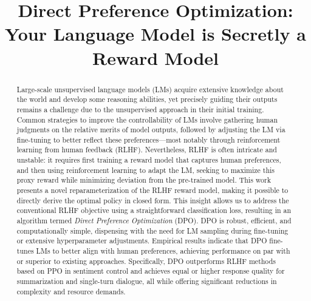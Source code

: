 \title{Direct Preference Optimization: Your Language Model is Secretly a Reward Model}

\begin{abstract}
Large-scale unsupervised language models (LMs) acquire extensive knowledge about the world and develop some reasoning abilities, yet precisely guiding their outputs remains a challenge due to the unsupervised approach in their initial training. Common strategies to improve the controllability of LMs involve gathering human judgments on the relative merits of model outputs, followed by adjusting the LM via fine-tuning to better reflect these preferences—most notably through reinforcement learning from human feedback (RLHF). Nevertheless, RLHF is often intricate and unstable: it requires first training a reward model that captures human preferences, and then using reinforcement learning to adapt the LM, seeking to maximize this proxy reward while minimizing deviation from the pre-trained model. This work presents a novel reparameterization of the RLHF reward model, making it possible to directly derive the optimal policy in closed form. This insight allows us to address the conventional RLHF objective using a straightforward classification loss, resulting in an algorithm termed \textit{Direct Preference Optimization} (DPO). DPO is robust, efficient, and computationally simple, dispensing with the need for LM sampling during fine-tuning or extensive hyperparameter adjustments. Empirical results indicate that DPO fine-tunes LMs to better align with human preferences, achieving performance on par with or superior to existing approaches. Specifically, DPO outperforms RLHF methods based on PPO in sentiment control and achieves equal or higher response quality for summarization and single-turn dialogue, all while offering significant reductions in complexity and resource demands.
\end{abstract}

